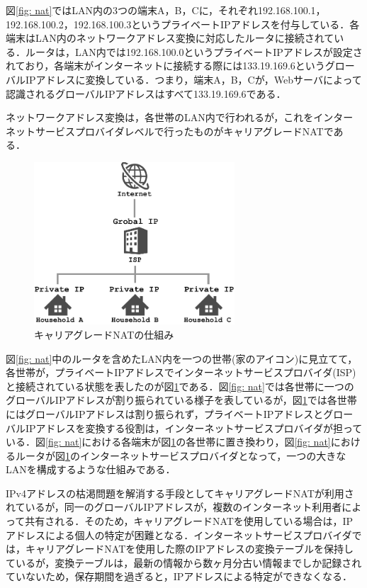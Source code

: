 \documentclass[10pt, a4paper]{jreport}
\begin{document}
図\ref{fig: nat}ではLAN内の3つの端末A，B，Cに，それぞれ192.168.100.1，192.168.100.2，192.168.100.3というプライベートIPアドレスを付与している．各端末はLAN内のネットワークアドレス変換に対応したルータに接続されている．ルータは，LAN内では192.168.100.0というプライベートIPアドレスが設定されており，各端末がインターネットに接続する際には133.19.169.6というグローバルIPアドレスに変換している．つまり，端末A，B，Cが，Webサーバによって認識されるグローバルIPアドレスはすべて133.19.169.6である．

ネットワークアドレス変換は，各世帯のLAN内で行われるが，これをインターネットサービスプロバイダレベルで行ったものがキャリアグレードNATである．

\begin{figure}[H]
	\begin{center}
		\includegraphics[width=75mm]{figures/cgn.pdf}
	\end{center}
	\caption{キャリアグレードNATの仕組み}
	\label{fig: cgn}
\end{figure}

図\ref{fig: nat}中のルータを含めたLAN内を一つの世帯(家のアイコン)に見立てて，各世帯が，プライベートIPアドレスでインターネットサービスプロバイダ(ISP)と接続されている状態を表したのが図\ref{fig: cgn}である．図\ref{fig: nat}では各世帯に一つのグローバルIPアドレスが割り振られている様子を表しているが，図\ref{fig: cgn}では各世帯にはグローバルIPアドレスは割り振られず，プライベートIPアドレスとグローバルIPアドレスを変換する役割は，インターネットサービスプロバイダが担っている．図\ref{fig: nat}における各端末が図\ref{fig: cgn}の各世帯に置き換わり，図\ref{fig: nat}におけるルータが図\ref{fig: cgn}のインターネットサービスプロバイダとなって，一つの大きなLANを構成するような仕組みである．

IPv4アドレスの枯渇問題を解消する手段としてキャリアグレードNATが利用されているが，同一のグローバルIPアドレスが，複数のインターネット利用者によって共有される．そのため，キャリアグレードNATを使用している場合は，IPアドレスによる個人の特定が困難となる．インターネットサービスプロバイダでは，キャリアグレードNATを使用した際のIPアドレスの変換テーブルを保持しているが，変換テーブルは，最新の情報から数ヶ月分古い情報までしか記録されていないため，保存期間を過ぎると，IPアドレスによる特定ができなくなる．
\end{document}
